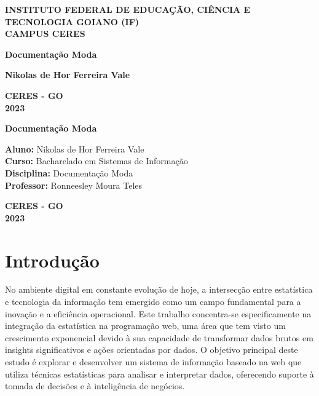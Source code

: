 \documentclass[12pt,a4paper]{article}
\begin{document}
\begin{titlepage}
    \centering
    \vspace*{1cm}
    \textbf{\Large INSTITUTO FEDERAL DE EDUCAÇÃO, CIÊNCIA E TECNOLOGIA GOIANO (IF)\\CAMPUS CERES}
    \vspace{1.5cm}

    \textbf{\Large Documentação Moda}
    \vspace{2cm}

    \textbf{\Large Nikolas de Hor Ferreira Vale}
    \vfill

    \textbf{\Large CERES - GO}\\
    \textbf{\Large 2023}
\end{titlepage}

\begin{titlepage}
    \centering
    \vspace*{1cm}
    \textbf{\Large Documentação Moda}
    \vspace{1.5cm}

    \begin{flushleft}
    \textbf{Aluno:} Nikolas de Hor Ferreira Vale\\
    \textbf{Curso:} Bacharelado em Sistemas de Informação\\
    \textbf{Disciplina:} Documentação Moda\\
    \textbf{Professor:} Ronneesley Moura Teles 
    \end{flushleft}
    \vfill

    \textbf{\Large CERES - GO}\\
    \textbf{\Large 2023}
\end{titlepage}

\setcounter{page}{1}

\tableofcontents
\newpage

\section{\textbf{Introdução}}

No ambiente digital em constante evolução de hoje, a intersecção entre estatística e tecnologia da informação tem emergido como um campo fundamental para a inovação e a eficiência operacional. Este trabalho concentra-se especificamente na integração da estatística na programação web, uma área que tem visto um crescimento exponencial devido à sua capacidade de transformar dados brutos em insights significativos e ações orientadas por dados. O objetivo principal deste estudo é explorar e desenvolver um sistema de informação baseado na web que utiliza técnicas estatísticas para analisar e interpretar dados, oferecendo suporte à tomada de decisões e à inteligência de negócios.
\end{document}
